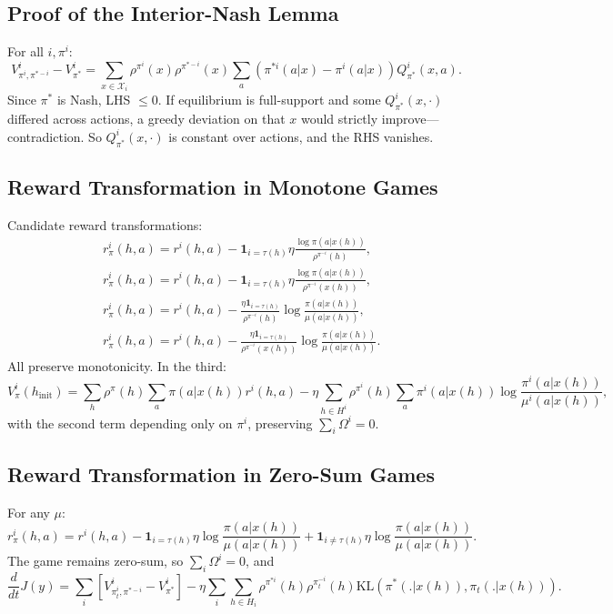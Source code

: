 \subsection{Proof of the Interior-Nash Lemma}
For all $i,\pi^i$:
$$V^i_{\pi^i, \pi^{*-i}} - V^i_{\pi^*} = \sum_{x\in\mathcal{X}_i}\rho^{\pi^i}(x)\rho^{\pi^{*-i}}(x)\sum_a(\pi^{*i}(a|x)-\pi^i(a|x))Q^i_{\pi^*}(x,a).$$
Since $\pi^*$ is Nash, LHS $\leq 0$. If equilibrium is full-support and some $Q^i_{\pi^*}(x,\cdot)$ differed across actions, a greedy deviation on that $x$ would strictly improve—contradiction. So $Q^i_{\pi^*}(x,\cdot)$ is constant over actions, and the RHS vanishes.

\subsection{Reward Transformation in Monotone Games}
Candidate reward transformations:
\begin{align*}
&r^i_\pi(h,a) = r^i(h,a) - \mathbf{1}_{i=\tau(h)}\eta\frac{\log\pi(a|x(h))}{\rho^{\pi^{-i}}(h)},\\
&r^i_\pi(h,a) = r^i(h,a) - \mathbf{1}_{i=\tau(h)}\eta\frac{\log\pi(a|x(h))}{\rho^{\pi^{-i}}(x(h))},\\
&r^i_\pi(h,a) = r^i(h,a) - \frac{\eta\mathbf{1}_{i=\tau(h)}}{\rho^{\pi^{-i}}(h)}\log\frac{\pi(a|x(h))}{\mu(a|x(h))},\\
&r^i_\pi(h,a) = r^i(h,a) - \frac{\eta\mathbf{1}_{i=\tau(h)}}{\rho^{\pi^{-i}}(x(h))}\log\frac{\pi(a|x(h))}{\mu(a|x(h))}.
\end{align*}
All preserve monotonicity. In the third:
$$V^i_\pi(h_{\textrm{init}}) = \sum_h \rho^\pi(h)\sum_a \pi(a|x(h))r^i(h,a) - \eta\sum_{h\in H^i}\rho^{\pi^i}(h)\sum_a \pi^i(a|x(h))\log\frac{\pi^i(a|x(h))}{\mu^i(a|x(h))},$$
with the second term depending only on $\pi^i$, preserving $\sum_i \Omega^i=0$.

\subsection{Reward Transformation in Zero-Sum Games}
For any $\mu$:
$$r^i_\pi(h,a) = r^i(h,a) - \mathbf{1}_{i=\tau(h)}\eta\log\frac{\pi(a|x(h))}{\mu(a|x(h))} + \mathbf{1}_{i\neq\tau(h)}\eta\log\frac{\pi(a|x(h))}{\mu(a|x(h))}.$$
The game remains zero-sum, so $\sum_i\Omega^i=0$, and
$$\frac{d}{dt}J(y) = \sum_{i}[V^i_{\pi^i_t,\pi^{*-i}} - V^i_{\pi^*}] - \eta\sum_i\sum_{h\in H_i}\rho^{\pi^{*i}}(h)\rho^{\pi_t^{-i}}(h)\textrm{KL}(\pi^*(.|x(h)),\pi_t(.|x(h))).$$

